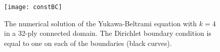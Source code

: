 \documentclass[final]{siamltex}
\renewcommand{\S} {\mathcal{S}}
\begin{document}
\begin{figure}
  \centering
  \texttt{[image: constBC]}
  \caption{\label{f:32ply} The numerical solution of the Yukawa-Beltrami
  equation with $k=4$ in a 32-ply connected domain.  The Dirichlet
  boundary condition is equal to one on each of the boundaries (black
  curves).}
\end{figure}






%
\end{document}

